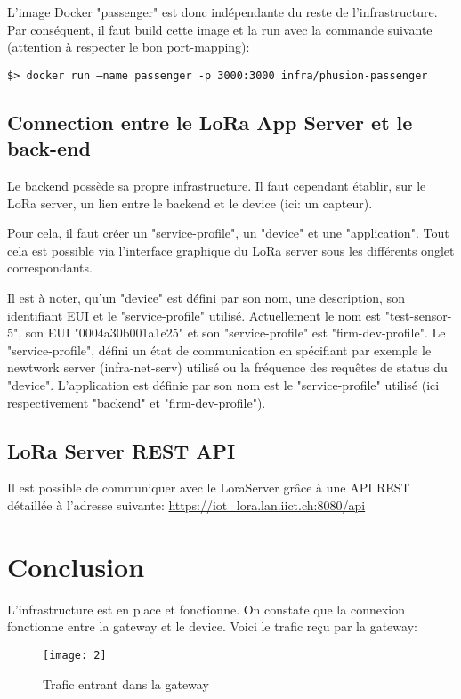 L'image Docker "passenger" est donc indépendante du reste de l'infrastructure. Par conséquent, il faut build cette image et la run avec la commande suivante (attention à respecter le bon port-mapping):

\texttt{\$> docker run —name passenger -p 3000:3000 infra/phusion-passenger}

\subsection{Connection entre le LoRa App Server et le back-end}

Le backend possède sa propre infrastructure. Il faut cependant établir, sur le LoRa server, un lien entre le backend et le device (ici: un capteur).

Pour cela, il faut créer un "service-profile", un "device" et une "application". Tout cela est possible via l'interface graphique du LoRa server sous les différents onglet correspondants.

Il est à noter, qu'un "device" est défini par son nom, une description, son identifiant EUI et le "service-profile" utilisé. Actuellement le nom est "test-sensor-5", son EUI "0004a30b001a1e25" et son "service-profile" est "firm-dev-profile". Le "service-profile", défini un état de communication en spécifiant par exemple le newtwork server (infra-net-serv) utilisé ou la fréquence des requêtes de status du "device". L'application est définie par son nom est le "service-profile" utilisé (ici respectivement "backend" et "firm-dev-profile").

\subsection{LoRa Server REST API}

Il est possible de communiquer avec le LoraServer grâce à une API REST détaillée à l'adresse suivante: \url{https://iot_lora.lan.iict.ch:8080/api}
\clearpage

\section{Conclusion}

L'infrastructure est en place et fonctionne. On constate que la connexion fonctionne entre la gateway et le device. Voici le trafic reçu par la gateway:

\vspace{2mm}
\begin{figure}[h!]
\centering
\texttt{[image: 2]}
\caption{Trafic entrant dans la gateway}
\end{figure}


